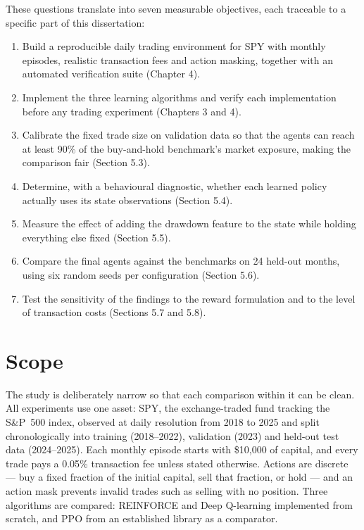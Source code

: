 These questions translate into seven measurable objectives, each traceable
to a specific part of this dissertation:

\begin{enumerate}
\def\labelenumi{O\arabic{enumi}.}
\item
  Build a reproducible daily trading environment for SPY with monthly
  episodes, realistic transaction fees and action masking, together with
  an automated verification suite (Chapter 4).
\item
  Implement the three learning algorithms and verify each implementation
  before any trading experiment (Chapters 3 and 4).
\item
  Calibrate the fixed trade size on validation data so that the agents
  can reach at least 90\% of the buy-and-hold benchmark's market
  exposure, making the comparison fair (Section 5.3).
\item
  Determine, with a behavioural diagnostic, whether each learned policy
  actually uses its state observations (Section 5.4).
\item
  Measure the effect of adding the drawdown feature to the state while
  holding everything else fixed (Section 5.5).
\item
  Compare the final agents against the benchmarks on 24 held-out months,
  using six random seeds per configuration (Section 5.6).
\item
  Test the sensitivity of the findings to the reward formulation and to
  the level of transaction costs (Sections 5.7 and 5.8).
\end{enumerate}

\section{Scope}

The study is deliberately narrow so that each comparison within it can be
clean. All experiments use one asset: SPY, the exchange-traded fund
tracking the S\&P~500 index, observed at daily resolution from 2018 to
2025 and split chronologically into training (2018--2022), validation
(2023) and held-out test data (2024--2025). Each monthly episode starts
with \$10,000 of capital, and every trade pays a 0.05\% transaction fee
unless stated otherwise. Actions are discrete --- buy a fixed fraction of
the initial capital, sell that fraction, or hold --- and an action mask
prevents invalid trades such as selling with no position. Three algorithms
are compared: REINFORCE and Deep Q-learning implemented from scratch, and
PPO from an established library as a comparator.

